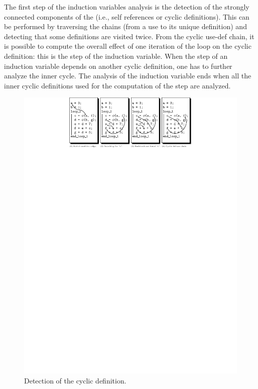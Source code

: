 The first step of the induction variables analysis is the detection of
the strongly connected components of the \SSA{} (i.e., self references
or cyclic definitions).  This can be performed by traversing the
\SSA{} chains (from a use to its unique definition) and detecting that
some definitions are visited twice.  From the cyclic use-def chain, it
is possible to compute the overall effect of one iteration of the loop
on the cyclic definition: this is the step of the induction variable.
When the step of an induction variable depends on another cyclic
definition, one has to further analyze the inner cycle.  The analysis
of the induction variable ends when all the inner cyclic definitions
used for the computation of the step are analyzed.

\begin{figure}[h]
  \begin{center}
    \includegraphics[width=1.2\textwidth]{iv_step}
  \end{center}
  \vspace{-50em}
  \caption{Detection of the cyclic definition.}
  \label{spop:fig:ivstep}
\end{figure}


